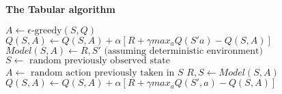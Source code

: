 \begin{algorithm}[ht]
	\DontPrintSemicolon
	\footnotesize
	
	\caption{\textbf{The Tabular \acronymDynaQ{}{} algorithm}}
	\label{alg:dynaq}
	{
		\nonl \;
		
		
		\nonl \;
		
		\For{$\varAtomicTask{}{} \in \varCompositeTask{}{} $}
		{
			$A \leftarrow \epsilon\text{-greedy}(S, Q)$\;
			$Q(S, A) \leftarrow Q(S, A) + \alpha [R +  \gamma max_a Q(S' a) - Q(S, A)]$\;
			$Model(S, A) \leftarrow R, S' \text{ (assuming deterministic environment)}$ \; 
			$S \leftarrow  \text{ random previously observed state}$\;
			$A \leftarrow \text{ random action previously taken in }S$\;
			$R, S \leftarrow Model(S, A)$ \;
			$Q(S, A) \leftarrow Q(S, A) + \alpha [R +  \gamma max_a Q(S', a) - Q(S, A)]$\;
		}
		\Return{$\functionInstanceQMappingSignature{}{}$}
	}
\end{algorithm}



